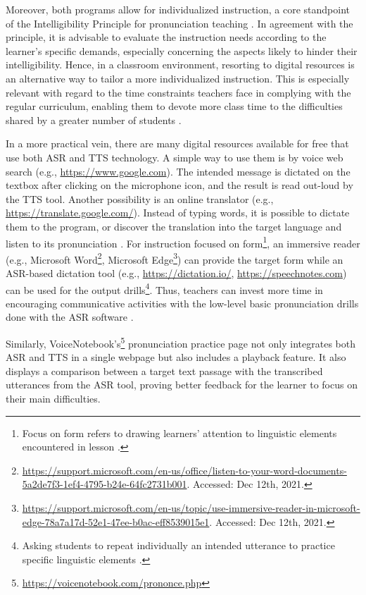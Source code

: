 \documentclass[english]{textolivre}
\begin{document}
Moreover, both programs allow for individualized instruction, a core standpoint of the Intelligibility Principle for pronunciation teaching \cite{thomson2015, munro2015}. In agreement with the principle, it is advisable to evaluate the instruction needs according to the learner's specific demands, especially concerning the aspects likely to hinder their intelligibility. Hence, in a classroom environment, resorting to digital resources is an alternative way to tailor a more individualized instruction. This is especially relevant with regard to the time constraints teachers face in complying with the regular curriculum, enabling them to devote more class time to the difficulties shared by a greater number of students \cite{roccamo2014, munro2015}.

In a more practical vein, there are many digital resources available for free that use both ASR and TTS technology. A simple way to use them is by voice web search (e.g., \url{https://www.google.com}). The intended message is dictated on the textbox after clicking on the microphone icon, and the result is read out-loud by the TTS tool. Another possibility is an online translator (e.g., \url{https://translate.google.com/}). Instead of typing words, it is possible to dictate them to the program, or discover the translation into the target language and listen to its pronunciation \cite[for a more detailed guideline, see]{carrier2017}. For instruction focused on form\footnote{Focus on form refers to drawing learners’ attention to linguistic elements encountered in lesson \cite{long1991}.}, an immersive reader (e.g., Microsoft Word\footnote{\url{https://support.microsoft.com/en-us/office/listen-to-your-word-documents-5a2de7f3-1ef4-4795-b24e-64fc2731b001}. Accessed: Dec 12th, 2021.}, Microsoft Edge\footnote{\url{https://support.microsoft.com/en-us/topic/use-immersive-reader-in-microsoft-edge-78a7a17d-52e1-47ee-b0ac-eff8539015e1}. Accessed: Dec 12th, 2021.}) can provide the target form while an ASR-based dictation tool (e.g., \url{https://dictation.io/}, \url{https://speechnotes.com}) can be used for the output drills\footnote{Asking students to repeat individually an intended utterance to practice specific linguistic elements \cite{harmer2012}.}. Thus, teachers can invest more time in encouraging communicative activities with the low-level basic pronunciation drills done with the ASR software \cite{kim2006}.

Similarly, VoiceNotebook’s\footnote{\url{https://voicenotebook.com/prononce.php}} pronunciation practice page not only integrates both ASR and TTS in a single webpage but also includes a playback feature. It also displays a comparison between a target text passage with the transcribed utterances from the ASR tool, proving better feedback for the learner to focus on their main difficulties.
\end{document}
